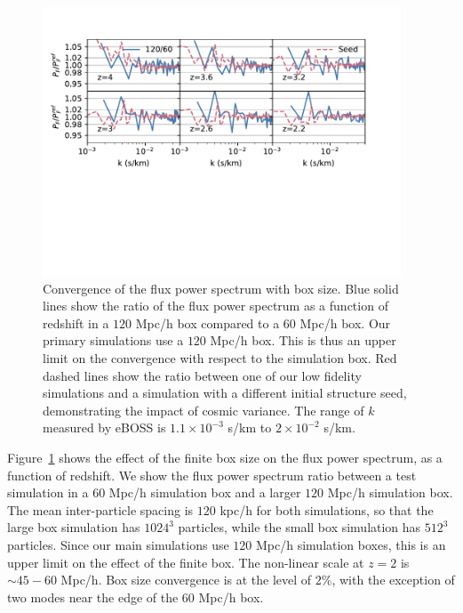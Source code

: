 \documentclass[a4paper,11pt]{article}
\newcommand{\Lya}{Lyman-$\alpha$}
\begin{document}
\begin{figure}
\includegraphics[width=0.95\textwidth,trim={0 4.5cm 1cm 0},clip]{figures/box-convergence.pdf}
 \caption{Convergence of the flux power spectrum with box size. Blue solid lines show the ratio of the flux power spectrum as a function of redshift in a $120$ Mpc/h box compared to a $60$ Mpc/h box. Our primary simulations use a $120$ Mpc/h box. This is thus an upper limit on the convergence with respect to the simulation box. Red dashed lines show the ratio between one of our low fidelity simulations and a simulation with a different initial structure seed, demonstrating the impact of cosmic variance. The range of $k$ measured by eBOSS is $1.1 \times 10^{-3}$ s/km to $2\times 10^{-2}$ s/km.}
 \label{fig:boxsize}
\end{figure}

Figure~\ref{fig:boxsize} shows the effect of the finite box size on the flux power spectrum, as a function of redshift. We show the flux power spectrum ratio between a test simulation in a $60$ Mpc/h simulation box and a larger $120$ Mpc/h simulation box. The mean inter-particle spacing is $120$ kpc/h for both simulations, so that the large box simulation has $1024^3$ particles, while the small box simulation has $512^3$ particles. Since our main simulations use $120$ Mpc/h simulation boxes, this is an upper limit on the effect of the finite box. The non-linear scale at $z=2$ is $\sim 45 - 60$ Mpc/h. Box size convergence is at the level of $2\%$, with the exception of two modes near the edge of the $60$ Mpc/h box.
\end{document}
